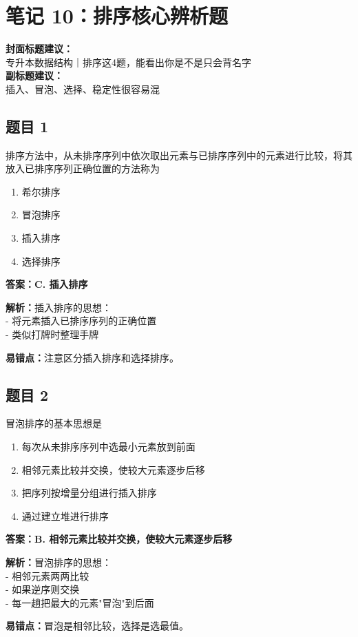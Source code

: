 \documentclass[12pt,a4paper]{ctexart}
\begin{document}
\newpage

\section{笔记 10：排序核心辨析题}
\begin{coverbox}
	\textbf{封面标题建议：}\\
	专升本数据结构｜排序这4题，能看出你是不是只会背名字\\
	\textbf{副标题建议：}\\
	插入、冒泡、选择、稳定性很容易混
\end{coverbox}

\subsection*{题目 1}
排序方法中，从未排序序列中依次取出元素与已排序序列中的元素进行比较，将其放入已排序序列正确位置的方法称为
\begin{enumerate}[label=\Alph*.]
	\item 希尔排序
	\item 冒泡排序
	\item 插入排序
	\item 选择排序
\end{enumerate}

\begin{answerbox}
	\textbf{答案：C. 插入排序}

	\textbf{解析：}插入排序的思想：\\
	- 将元素插入已排序序列的正确位置\\
	- 类似打牌时整理手牌

	\textbf{易错点：}注意区分插入排序和选择排序。
\end{answerbox}

\subsection*{题目 2}
冒泡排序的基本思想是
\begin{enumerate}[label=\Alph*.]
	\item 每次从未排序序列中选最小元素放到前面
	\item 相邻元素比较并交换，使较大元素逐步后移
	\item 把序列按增量分组进行插入排序
	\item 通过建立堆进行排序
\end{enumerate}

\begin{answerbox}
	\textbf{答案：B. 相邻元素比较并交换，使较大元素逐步后移}

	\textbf{解析：}冒泡排序的思想：\\
	- 相邻元素两两比较\\
	- 如果逆序则交换\\
	- 每一趟把最大的元素"冒泡"到后面

	\textbf{易错点：}冒泡是相邻比较，选择是选最值。
\end{answerbox}
\end{document}
